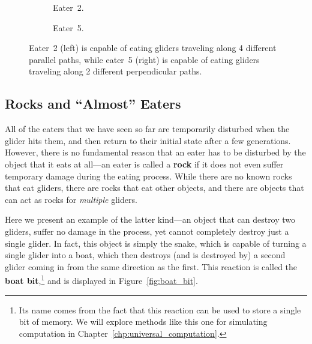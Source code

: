 \begin{figure}[!htb]
	\begin{subfigure}{.5\textwidth}
		\centering
		\caption{Eater~2.}
		\label{fig:eater_2}
	\end{subfigure}%
	\begin{subfigure}{.5\textwidth}
		\centering
		\caption{Eater~5.}
		\label{fig:eater_5}
	\end{subfigure}
	\caption{Eater~2 (left) is capable of eating gliders traveling along 4 different parallel paths, while eater~5 (right) is capable of eating gliders traveling along 2 different perpendicular paths.}\label{fig:eater_2_5}
\end{figure}


\subsection{Rocks and ``Almost'' Eaters}\label{sec:rocks_almost_eaters}

All of the eaters that we have seen so far are temporarily disturbed when the glider hits them, and then return to their initial state after a few generations. However, there is no fundamental reason that an eater has to be disturbed by the object that it eats at all---an eater is called a \textbf{rock} if it does not even suffer temporary damage during the eating process. While there are no known rocks that eat gliders, there are rocks that eat other objects, and there are objects that can act as rocks for \emph{multiple} gliders.

Here we present an example of the latter kind---an object that can destroy two gliders, suffer no damage in the process, yet cannot completely destroy just a single glider. In fact, this object is simply the snake, which is capable of turning a single glider into a boat, which then destroys (and is destroyed by) a second glider coming in from the same direction as the first. This reaction is called the \textbf{boat bit},\footnote{Its name comes from the fact that this reaction can be used to store a single bit of memory. We will explore methods like this one for simulating computation in Chapter~\ref{chp:universal_computation}.} and is displayed in Figure~\ref{fig:boat_bit}.

